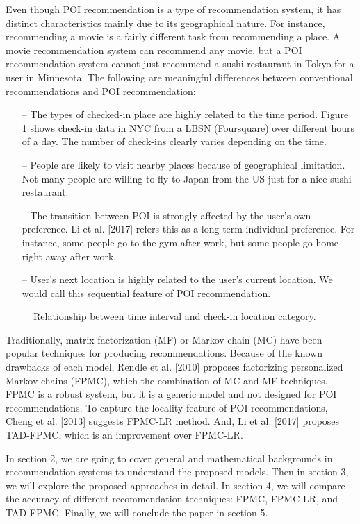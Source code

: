 \documentclass{sig-alternate}
\begin{document}
Even though POI recommendation is a type of recommendation system, it has distinct characteristics 
mainly due to its geographical nature. For instance, recommending a movie is a fairly different task from 
recommending a place. A movie recommendation system can recommend any movie, but a POI recommendation 
system cannot just recommend a sushi restaurant in Tokyo for a user in Minnesota. The following are 
meaningful differences between conventional recommendations and POI recommendation:

\begin{itemize}
\item[--] The types of checked-in place are highly related to the time period. Figure \ref{fig:NYC_checkIn} shows check-in data in 
NYC from a LBSN (Foursquare) over different hours of a day. The number of check-ins clearly varies depending 
on the time.
\item[--] People are likely to visit nearby places because of geographical limitation. Not many people are willing 
to fly to Japan from the US just for a nice sushi restaurant.
\item[--] The transition between POI is strongly affected by the user's own preference. Li et al. [2017] refers this as a long-term individual preference. For instance, some people go to the gym after work, but some people go home right away after work. 
\item[--] User's next location is highly related to the user's current location. We would call this sequential feature of POI recommendation. 
\end{itemize}

\begin{figure}
\centering
{}
\caption{Relationship between time interval and check-in location category.}
\label{fig:NYC_checkIn}
\end{figure}

Traditionally, matrix factorization (MF) or Markov chain (MC) have been popular techniques for producing recommendations. 
Because of the known drawbacks of each model, Rendle et al. [2010] proposes factorizing personalized 
Markov chains (FPMC), which the combination of MC and MF techniques. FPMC is a robust system, 
but it is a generic model and not designed for POI recommendations. To capture the locality feature of 
POI recommendations, Cheng et al. [2013] suggests FPMC-LR method. And, Li et al. [2017] proposes 
TAD-FPMC, which is an improvement over FPMC-LR.

In section 2, we are going to cover general and mathematical backgrounds in recommendation systems 
to understand the proposed models. Then in section 3, we will explore the proposed approaches in detail. 
In section 4, we will compare the accuracy of different recommendation techniques: FPMC, FPMC-LR, and TAD-FPMC. 
Finally, we will conclude the paper in section 5.
\end{document}
